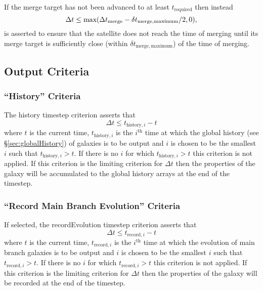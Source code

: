 If the merge target has not been advanced to at least $t_\mathrm{required}$ then instead
\begin{equation}
\Delta t \le \hbox{max}(\Delta t_\mathrm{merge}-\delta t_\mathrm{merge,maximum}/2,0),
\end{equation}
is asserted to ensure that the satellite does not reach the time of merging until its merge target is sufficiently close (within $\delta t_\mathrm{merge,maximum}$) of the time of merging.

\subsection{Output Criteria}

\subsubsection{``History'' Criteria}\label{phys:mergerTreeEvolveTimestep:mergerTreeEvolveTimestepHistory}

The {\normalfont \ttfamily history} timestep criterion asserts that
\begin{equation}
 \Delta t \le t_{\mathrm{history},i} - t
\end{equation}
where $t$ is the current time, $t_{\mathrm{history},i}$ is the $i^\mathrm{th}$ time at which the global history (see \S\ref{sec:globalHistory}) of galaxies is to be output and $i$ is chosen to be the smallest $i$ such that $t_{\mathrm{history},i} > t$. If there is no $i$ for which $t_{\mathrm{history},i} > t$ this criterion is not applied. If this criterion is the limiting criterion for $\Delta t$ then the properties of the galaxy will be accumulated to the global history arrays at the end of the timestep.

\subsubsection{``Record Main Branch Evolution'' Criteria}\label{phys:mergerTreeEvolveTimestep:mergerTreeEvolveTimestepRecordEvolution}

If selected, the {\normalfont \ttfamily recordEvolution} timestep criterion asserts that
\begin{equation}
 \Delta t \le t_{\mathrm{record},i} - t
\end{equation}
where $t$ is the current time, $t_{\mathrm{record},i}$ is the $i^\mathrm{th}$ time at which the evolution of main branch galaxies is to be output and $i$ is chosen to be the smallest $i$ such that $t_{\mathrm{record},i} > t$. If there is no $i$ for which $t_{\mathrm{record},i} > t$ this criterion is not applied. If this criterion is the limiting criterion for $\Delta t$ then the properties of the galaxy will be recorded at the end of the timestep.
